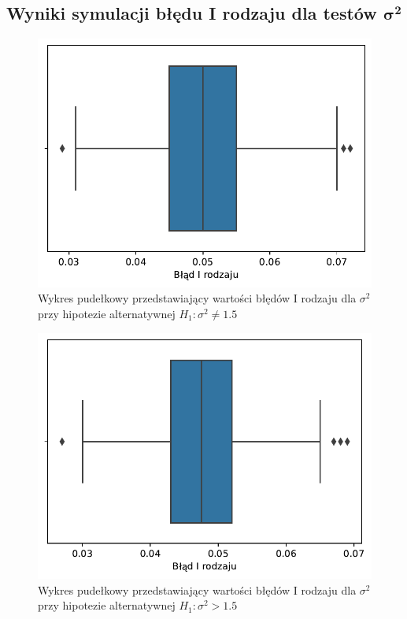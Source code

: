 \documentclass[12pt]{mwart}
\begin{document}
	
	\subsection{Wyniki symulacji błędu I rodzaju dla testów $\bm{\sigma^2}$}
	
	\begin{figure}[H]
	\begin{center}
		\includegraphics[scale=0.6]{box4.pdf}
		\caption{Wykres pudełkowy przedstawiający wartości błędów I rodzaju dla $\sigma^2$ przy hipotezie alternatywnej $H_1 \colon \sigma^2 \neq 1.5$}
	\end{center}
	\end{figure}
	
	
	\begin{figure}[H]
	\begin{center}
		\includegraphics[scale=0.6]{box5.pdf}
		\caption{Wykres pudełkowy przedstawiający wartości błędów I rodzaju dla $\sigma^2$ przy hipotezie alternatywnej $H_1 \colon \sigma^2 > 1.5$}
	\end{center}
	\end{figure}
	
\end{document}
